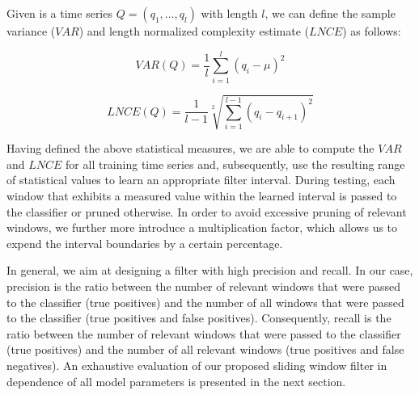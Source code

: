 Given is a time series $Q = (q_1, \dots, q_l)$ with length $l$, we can define the sample variance ($VAR$) and length normalized complexity estimate ($LNCE$) as follows:

\begin{equation}
    VAR(Q) = \frac{1}{l}\sum \limits_{i=1}^{l} (q_i - \mu)^2
\end{equation}

\begin{equation}
    LNCE(Q) = \frac{1}{l-1}\sqrt[2]{\sum \limits_{i=1}^{l-1} (q_i - q_{i + 1})^2}
\end{equation}

Having defined the above statistical measures, we are able to compute the $VAR$ and $LNCE$ for all training time series and, subsequently, use the resulting range of statistical values to learn an appropriate filter interval. During testing, each window that exhibits a measured value within the learned interval is passed to the classifier or pruned otherwise. In order to avoid excessive pruning of relevant windows, we further more introduce a multiplication factor, which allows us to expend the interval boundaries by a certain percentage.

In general, we aim at designing a filter with high precision and recall. In our case, precision is the ratio between the number of relevant windows that were passed to the classifier (true positives) and the number of all windows that were passed to the classifier (true positives and false positives). Consequently, recall is the ratio between the number of relevant windows that were passed to the classifier (true positives) and the number of all relevant windows (true positives and false negatives). An exhaustive evaluation of our proposed sliding window filter in dependence of all model parameters is presented in the next section. 